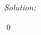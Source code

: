 \documentclass[12pt,a4paper]{article}
\newenvironment{sol}
    {\emph{Solution:}
    }
    {
    \qed
    }
\begin{document}
\begin{sol}
\begin{itemize}

\end{itemize}
\end{sol}
\end{document}
